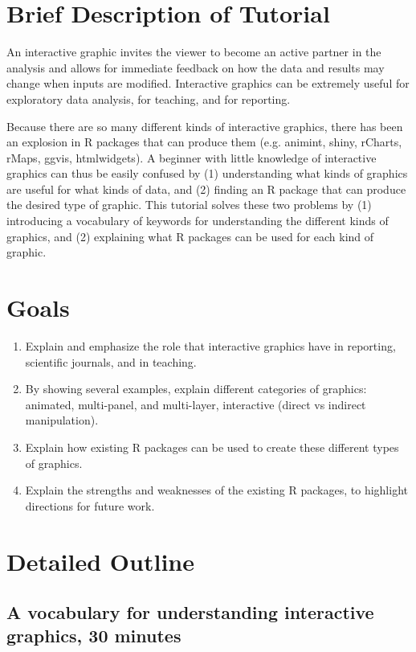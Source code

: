 \documentclass[11pt]{article}
\begin{document}
\section{Brief Description of Tutorial}
\label{sec:orgheadline5}

An interactive graphic invites the viewer to become an active partner
in the analysis and allows for immediate feedback on how the data and
results may change when inputs are modified. Interactive graphics can
be extremely useful for exploratory data analysis, for teaching, and
for reporting.

Because there are so many different kinds of interactive graphics,
there has been an explosion in R packages that can produce them
(e.g. animint, shiny, rCharts, rMaps, ggvis, htmlwidgets). A beginner
with little knowledge of interactive graphics can thus be easily
confused by (1) understanding what kinds of graphics are useful for
what kinds of data, and (2) finding an R package that can produce the
desired type of graphic. This tutorial solves these two problems by
(1) introducing a vocabulary of keywords for understanding the
different kinds of graphics, and (2) explaining what R packages can be
used for each kind of graphic.

\section{Goals}
\label{sec:orgheadline6}

\begin{enumerate}
\item Explain and emphasize the role that interactive graphics have in
reporting, scientific journals, and in teaching.
\item By showing several examples, explain different categories of
graphics: animated, multi-panel, and multi-layer, interactive
(direct vs indirect manipulation).
\item Explain how existing R packages can be used to create these
different types of graphics.
\item Explain the strengths and weaknesses of the existing R packages, to
highlight directions for future work.
\end{enumerate}

\section{Detailed Outline}
\label{sec:orgheadline10}

\subsection{A vocabulary for understanding interactive graphics, 30 minutes}
\label{sec:orgheadline7}
\end{document}
